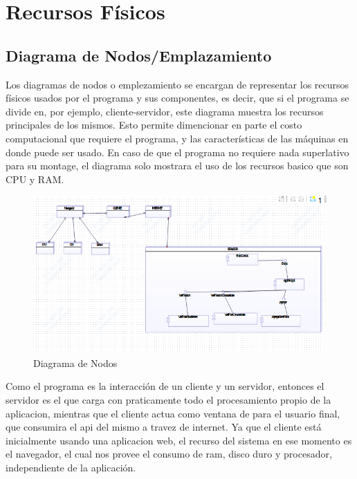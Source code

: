 \chapter{Recursos Físicos}
\section{Diagrama de Nodos/Emplazamiento}

Los diagramas de nodos o emplezamiento se encargan de representar los recursos físicos usados por el programa y sus componentes, es decir, que si el programa se divide en, por ejemplo, cliente-servidor, este diagrama muestra los recursos principales de los mismos. Esto permite dimencionar en parte el costo computacional que requiere el programa, y las características de las máquinas en donde puede ser usado. En caso de que el programa no requiere nada superlativo para su montage, el diagrama solo mostrara el uso de los recursos basico que son CPU y RAM.

\begin{figure}[H]
	\centering
	\includegraphics[width=1\linewidth]{parte2/imgs/DiagramaDeNodos/nodo}
	\caption{Diagrama de Nodos}
	\label{fig:nodos}
\end{figure}
\clearpage
Como el programa es la interacción de un cliente y un servidor, entonces el servidor es el que carga con praticamente todo el procesamiento propio de la aplicacion, mientras que el cliente actua como ventana de para el usuario final, que consumira el api del mismo a travez de internet. Ya que el cliente está inicialmente usando una aplicacion web, el recurso del sistema en ese momento es el navegador, el cual nos provee el consumo de ram, disco duro y procesador, independiente de la aplicación.
